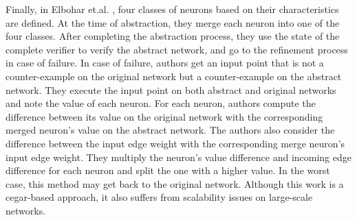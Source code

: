 Finally, in Elbohar et.al. \cite{elboher2020abstraction}, four classes of neurons based on their 
characteristics are defined. At the time of abstraction, they merge each neuron into one of the four classes.  
After completing the abstraction process, they use the state of the complete verifier to verify  
the abstract network, and go to the refinement process in case of failure. 
In case of failure,  authors get an input point that is not a counter-example on the original network 
but a counter-example on the abstract network. They execute the input point on both abstract and original networks and 
note the value of each neuron. For each neuron, authors compute the difference between its value on the original
network with the corresponding merged neuron's value on the abstract network. The authors also consider the difference between the input edge weight with the corresponding
merge neuron's input edge weight. They multiply the neuron's value difference and incoming edge difference
for each neuron and split the one with a higher value. In the worst case, this method may get back to the original network.
Although this work is a cegar-based approach, 
it also suffers from scalability issues on large-scale networks.   



